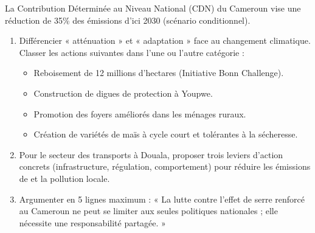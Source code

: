 \documentclass[11pt]{article}
\begin{document}
\begin{exercice}
\label{exo:atténuation}
La Contribution Déterminée au Niveau National (CDN) du Cameroun vise une réduction de 35\% des émissions d'ici 2030 (scénario conditionnel).
\begin{enumerate}
    \item Différencier « atténuation » et « adaptation » face au changement climatique. Classer les actions suivantes dans l'une ou l'autre catégorie :
    \begin{itemize}
        \item Reboisement de 12 millions d'hectares (Initiative Bonn Challenge).
        \item Construction de digues de protection à Youpwe.
        \item Promotion des foyers améliorés dans les ménages ruraux.
        \item Création de variétés de maïs à cycle court et tolérantes à la sécheresse.
    \end{itemize}
    \item Pour le secteur des transports à Douala, proposer trois leviers d'action concrets (infrastructure, régulation, comportement) pour réduire les émissions de  et la pollution locale.
    \item Argumenter en 5 lignes maximum : « La lutte contre l'effet de serre renforcé au Cameroun ne peut se limiter aux seules politiques nationales ; elle nécessite une responsabilité partagée. »
\end{enumerate}
\end{exercice}
\end{document}
